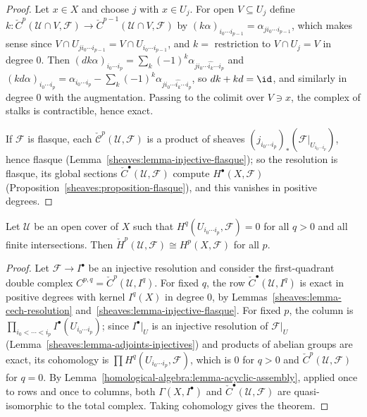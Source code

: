 \begin{proof}
Let $x \in X$ and choose $j$ with $x \in U_j$. For open $V \subseteq U_j$ define $k \colon \check{C}^p(\mathcal{U} \cap V, \mathcal{F}) \to \check{C}^{p-1}(\mathcal{U} \cap V, \mathcal{F})$ by
$(k\alpha)_{i_0 \cdots i_{p-1}} = \alpha_{ji_0 \cdots i_{p-1}}$, which makes sense since $V \cap U_{ji_0 \cdots i_{p-1}} = V \cap U_{i_0 \cdots i_{p-1}}$, and $k = $ restriction to $V \cap U_j = V$ in
degree $0$. Then
$(dk\alpha)_{i_0 \cdots i_p} = \sum_k(-1)^k\alpha_{ji_0 \cdots \widehat{i_k} \cdots i_p}$ and $(kd\alpha)_{i_0 \cdots i_p} = \alpha_{i_0 \cdots i_p} - \sum_k(-1)^k\alpha_{ji_0 \cdots \widehat{i_k} \cdots i_p}$, so
$dk + kd = \id$, and similarly in degree $0$ with the augmentation. Passing to the colimit over $V \ni x$, the complex of stalks is contractible, hence exact.

If $\mathcal{F}$ is flasque, each $\check{\mathcal{C}}^p(\mathcal{U}, \mathcal{F})$ is a product of sheaves $(j_{i_0 \cdots i_p})_*(\mathcal{F}|_{U_{i_0 \cdots i_p}})$, hence flasque
(Lemma~\ref{sheaves:lemma-injective-flasque}); so the resolution is flasque, its global sections $\check{C}^\bullet(\mathcal{U}, \mathcal{F})$ compute $H^\bullet(X, \mathcal{F})$
(Proposition~\ref{sheaves:proposition-flasque}), and this vanishes in positive degrees.
\end{proof}

\begin{theorem}[Leray]\label{sheaves:theorem-leray}
Let $\mathcal{U}$ be an open cover of $X$ such that $H^q(U_{i_0 \cdots i_p}, \mathcal{F}) = 0$ for all $q > 0$ and all finite intersections. Then
$\check{H}^p(\mathcal{U}, \mathcal{F}) \cong H^p(X, \mathcal{F})$ for all $p$.
\end{theorem}

\begin{proof}
Let $\mathcal{F} \to I^\bullet$ be an injective resolution and consider the first-quadrant double complex $C^{p,q} = \check{C}^p(\mathcal{U}, I^q)$. For fixed $q$, the row
$\check{C}^\bullet(\mathcal{U}, I^q)$ is exact in positive degrees with kernel $I^q(X)$ in degree $0$, by Lemmas~\ref{sheaves:lemma-cech-resolution}
and~\ref{sheaves:lemma-injective-flasque}. For fixed $p$, the column is $\prod_{i_0 < \cdots < i_p}I^\bullet(U_{i_0 \cdots i_p})$; since $I^\bullet|_U$ is an injective
resolution of $\mathcal{F}|_U$ (Lemma~\ref{sheaves:lemma-adjoints-injectives}) and products of abelian groups are exact, its cohomology is
$\prod H^q(U_{i_0 \cdots i_p}, \mathcal{F})$, which is $0$ for $q > 0$ and $\check{C}^p(\mathcal{U}, \mathcal{F})$ for $q = 0$. By Lemma~\ref{homological-algebra:lemma-acyclic-assembly},
applied once to rows and once to columns, both $\Gamma(X, I^\bullet)$ and $\check{C}^\bullet(\mathcal{U}, \mathcal{F})$ are quasi-isomorphic to the total complex. Taking cohomology gives the
theorem.
\end{proof}

